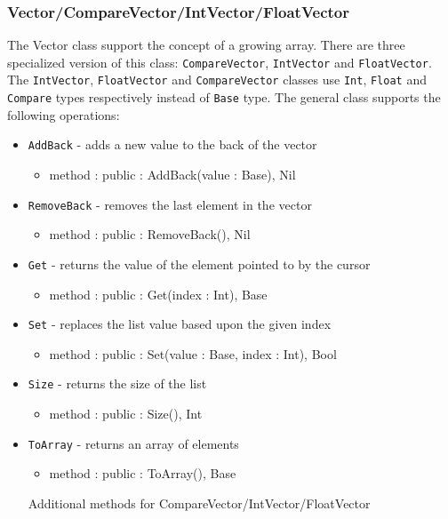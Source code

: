 \documentclass[12pt]{article}
\begin{document}
\subsubsection{Vector/CompareVector/IntVector/FloatVector}
The Vector class support the concept of a growing array.  There are three specialized version of this class: \texttt{CompareVector}, \texttt{IntVector} and \texttt{FloatVector}.  The \texttt{IntVector}, \texttt{FloatVector} and \texttt{CompareVector} classes use \texttt{Int}, \texttt{Float} and \texttt{Compare} types respectively instead of \texttt{Base} type.  The general class supports the following operations:
\begin{itemize}
    \item \texttt{AddBack} - adds a new value to the back of the vector
    	\begin{itemize}
	\item method : public : AddBack(value : Base), Nil
	\end{itemize}
    \item \texttt{RemoveBack} - removes the last element in the vector
    	\begin{itemize}
	\item method : public : RemoveBack(), Nil
	\end{itemize}
    \item \texttt{Get} - returns the value of the element  pointed to by the cursor
    	\begin{itemize}
	\item method : public : Get(index : Int), Base
	\end{itemize}
    \item \texttt{Set} - replaces the list value based upon the given index
    	\begin{itemize}
	\item method : public : Set(value : Base, index : Int), Bool
	\end{itemize}
    \item \texttt{Size} - returns the size of the list
    	\begin{itemize}
	\item method : public : Size(), Int
	\end{itemize}
    \item \texttt{ToArray} - returns an array of elements
    	\begin{itemize}
	\item method : public : ToArray(), Base
	\end{itemize}
Additional methods for CompareVector/IntVector/FloatVector

\end{itemize}
\end{document}
